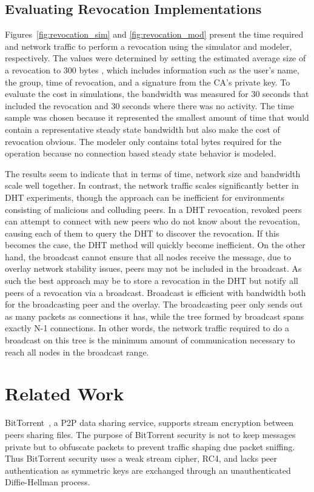 \subsection{Evaluating Revocation Implementations}
\label{evaluation_revocation}
Figures~\ref{fig:revocation_sim} and \ref{fig:revocation_mod} present the time
required and network traffic to perform a revocation using the simulator and
modeler, respectively.  The values were determined by setting the estimated
average size of a revocation to 300 bytes , which includes information such as
the user's name, the group, time of revocation, and a signature from the CA's
private key.  To evaluate the cost in simulations, the bandwidth was measured
for 30 seconds that included the revocation and 30 seconds where there was no
activity.  The time sample was chosen because it represented the smallest
amount of time that would contain a representative steady state bandwidth but
also make the cost of revocation obvious.  The modeler only contains total
bytes required for the operation because no connection based steady state
behavior is modeled.

The results seem to indicate that in terms of time, network size and bandwidth
scale well together.  In contrast, the network traffic scales significantly
better in DHT experiments, though the approach can be inefficient for
environments consisting of malicious and colluding peers.  In a DHT revocation,
revoked peers can attempt to connect with new peers who do not know about the
revocation, causing each of them to query the DHT to discover the revocation.
If this becomes the case, the DHT method will quickly become inefficient.  On
the other hand, the broadcast cannot ensure that all nodes receive the message,
due to overlay network stability issues, peers may not be included in the
broadcast.  As such the best approach may be to store a revocation in the DHT
but notify all peers of a revocation via a broadcast.  Broadcast is efficient
with bandwidth both for the broadcasting peer and the overlay.  The
broadcasting peer only sends out as many packets as connections it has, while
the tree formed by broadcast spans exactly N-1 connections.  In other words,
the network traffic required to do a broadcast on this tree is the minimum
amount of communication necessary to reach all nodes in the broadcast range.

\section{Related Work}
BitTorrent~\cite{bittorrent_security}, a P2P data sharing service,  supports
stream encryption between peers sharing files.  The purpose of BitTorrent
security is not to keep messages private but to obfuscate packets to
prevent traffic shaping due packet sniffing. Thus BitTorrent security uses a
weak stream cipher, RC4, and lacks peer authentication as symmetric keys are
exchanged through an unauthenticated Diffie-Hellman process.

